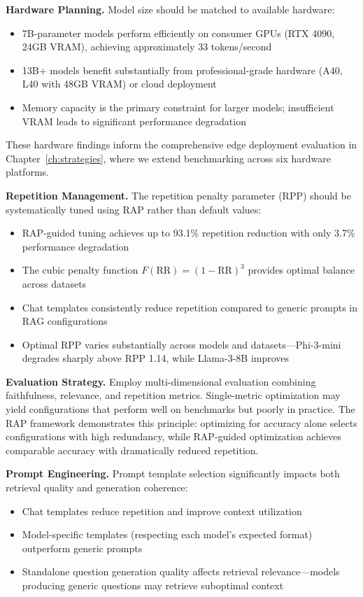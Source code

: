 \textbf{Hardware Planning.} Model size should be matched to available hardware:
\begin{itemize}[leftmargin=*]
    \item 7B-parameter models perform efficiently on consumer GPUs (RTX 4090, 24GB VRAM), achieving approximately 33 tokens/second
    \item 13B+ models benefit substantially from professional-grade hardware (A40, L40 with 48GB VRAM) or cloud deployment
    \item Memory capacity is the primary constraint for larger models; insufficient VRAM leads to significant performance degradation
\end{itemize}
These hardware findings inform the comprehensive edge deployment evaluation in Chapter~\ref{ch:strategies}, where we extend benchmarking across six hardware platforms.

\textbf{Repetition Management.} The repetition penalty parameter (RPP) should be systematically tuned using RAP rather than default values:
\begin{itemize}[leftmargin=*]
    \item RAP-guided tuning achieves up to 93.1\% repetition reduction with only 3.7\% performance degradation
    \item The cubic penalty function $F(\text{RR}) = (1-\text{RR})^3$ provides optimal balance across datasets
    \item Chat templates consistently reduce repetition compared to generic prompts in RAG configurations
    \item Optimal RPP varies substantially across models and datasets---Phi-3-mini degrades sharply above RPP 1.14, while Llama-3-8B improves
\end{itemize}

\textbf{Evaluation Strategy.} Employ multi-dimensional evaluation combining faithfulness, relevance, and repetition metrics. Single-metric optimization may yield configurations that perform well on benchmarks but poorly in practice. The RAP framework demonstrates this principle: optimizing for accuracy alone selects configurations with high redundancy, while RAP-guided optimization achieves comparable accuracy with dramatically reduced repetition.

\textbf{Prompt Engineering.} Prompt template selection significantly impacts both retrieval quality and generation coherence:
\begin{itemize}[leftmargin=*]
    \item Chat templates reduce repetition and improve context utilization
    \item Model-specific templates (respecting each model's expected format) outperform generic prompts
    \item Standalone question generation quality affects retrieval relevance---models producing generic questions may retrieve suboptimal context
\end{itemize}

